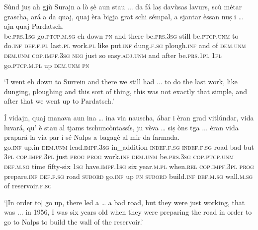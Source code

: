 \clearpage

\begin{linenumbers}
\gll   Sùnd juṣ ah gjù Surajn a lò ṣè aun stau ... da fá laṣ davùsas lavurs, scù métar grascha, ará a da quaj, quaj èra bigja grat schi sémpal, a sjantar èssan nuṣ i … ajn quaj Pardatsch. \\
 be.\textsc{prs.1sg} go.\textsc{ptcp.m.sg} eh down \textsc{pn} and there be.\textsc{prs.3sg}  still be.\textsc{ptcp.unm} {} to do.\textsc{inf} \textsc{def.f.pl} last.\textsc{pl} work.\textsc{pl} like put.\textsc{inf} dung.\textsc{f.sg}  plough.\textsc{inf} and of \textsc{dem.unm} \textsc{dem.unm}  \textsc{cop.impf.3sg} \textsc{neg} just so easy.\textsc{adj.unm} and after be.\textsc{prs.1pl} \textsc{1pl} go.\textsc{ptcp.m.pl} {} up \textsc{dem.unm} \textsc{pn}\\
\end{linenumbers}
\medskip
\glt `I went eh down to Surrein and there we still had ... to do the last work, like dunging, ploughing and this sort of thing, this was not exactly that simple, and after that we went up to Pardatsch.'
\medskip

\begin{linenumbers}
\gll Í vidajn, quaj manava aun ina … ina via nauscha, ábar i èran grad vitlúndar, vida luvará, qu’ è stau al tjams tschuncòntassís, ju vèva … siṣ òns tga ... èran vida prapará la via par í sé Nalps a bagagè al mir da farmada.   \\
 go.\textsc{inf} up.in \textsc{dem.unm} lead.\textsc{impf.3sg} in\_addition  \textsc{indef.f.sg} {} \textsc{indef.f.sg} road bad but \textsc{3pl} \textsc{cop.impf.3pl} just \textsc{prog} \textsc{prog} work.\textsc{inf} \textsc{dem.unm} be.\textsc{prs.3sg} \textsc{cop.ptcp.unm} \textsc{def.m.sg}  time fifty-six \textsc{1sg} have.\textsc{impf.1sg} {} six year.\textsc{m.pl} when.\textsc{rel} {} \textsc{cop.impf.3pl} \textsc{prog} prepare.\textsc{inf} \textsc{def.f.sg} road \textsc{subord} go.\textsc{inf} up \textsc{pn} \textsc{subord} build.\textsc{inf} \textsc{def.m.sg} wall.\textsc{m.sg} of reservoir.\textsc{f.sg} \\ 
\end{linenumbers} 
\medskip
\glt `[In order to] go up, there led a … a bad road, but they were just working, that was ... in 1956, I was six years old when they were preparing the road in order to go to Nalps to build the wall of the reservoir.'
\medskip

